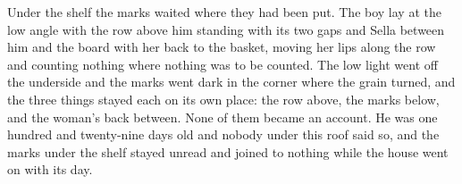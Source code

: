 Under the shelf the marks waited where they had been put. The boy lay at the low angle with the row above him standing with its two gaps and Sella between him and the board with her back to the basket, moving her lips along the row and counting nothing where nothing was to be counted. The low light went off the underside and the marks went dark in the corner where the grain turned, and the three things stayed each on its own place: the row above, the marks below, and the woman's back between. None of them became an account. He was one hundred and twenty-nine days old and nobody under this roof said so, and the marks under the shelf stayed unread and joined to nothing while the house went on with its day.
